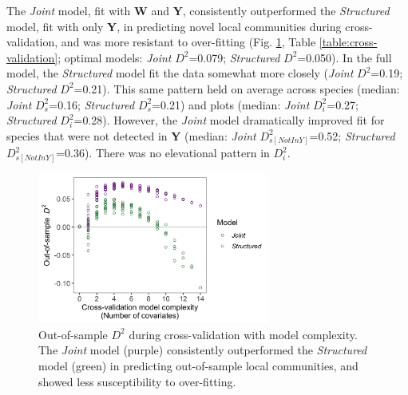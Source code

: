\documentclass[preprint,final,times,12pt,3p]{elsarticle}
\begin{document}
The \emph{Joint} model, fit with \textbf{W} and \textbf{Y}, consistently outperformed the \emph{Structured} model, fit with only \textbf{Y}, in predicting novel local communities during cross-validation, and was more resistant to over-fitting (Fig. \ref{fig:cross-validation}, Table \ref{table:cross-validation}; optimal models: \emph{Joint} $D^2$=0.079; \emph{Structured} $D^2$=0.050). In the full model, the \emph{Structured} model fit the data somewhat more closely (\emph{Joint} $D^2$=0.19; \emph{Structured} $D^2$=0.21). This same pattern held on average across species (median: \emph{Joint} $D^2_s$=0.16; \emph{Structured} $D^2_s$=0.21) and plots (median: \emph{Joint} $D^2_i$=0.27; \emph{Structured} $D^2_i$=0.28). However, the \emph{Joint} model dramatically improved fit for species that were not detected in \textbf{Y} (median: \emph{Joint} $D^2_{s[Not In Y]}$=0.52; \emph{Structured} $D^2_{s[Not In Y]}$=0.36). There was no elevational pattern in $D^2_i$.

\begin{figure}
	\centering\includegraphics[width=3in]{../../../ms/1_Ecography/1/figs/crossvalidation.png}
	\caption{\label{fig:cross-validation} Out-of-sample $D^2$ during cross-validation with model complexity. The \emph{Joint} model (purple) consistently outperformed the \emph{Structured} model (green) in predicting out-of-sample local communities, and showed less susceptibility to over-fitting.  }
\end{figure}
\end{document}

